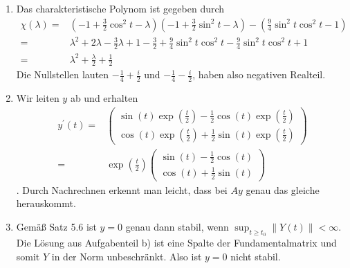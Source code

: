 \begin{solution}
\begin{enumerate}[label = \textbf{\alph*)}]
  \item Das charakteristische Polynom ist gegeben durch
  \begin{align*}
    \chi (\lambda) =& (-1 + \frac{3}{2}\cos^2 t - \lambda)(-1 + \frac{3}{2}\sin^2 t - \lambda) - (\frac{9}{4}\sin^2 t \cos^2 t - 1) \\
    =& \lambda^2 +2\lambda - \frac{3}{2} \lambda + 1 - \frac{3}{2} + \frac{9}{4}\sin^2 t \cos^2 t - \frac{9}{4} \sin^{2} t \cos^2 t + 1 \\
    =& \lambda^2 + \frac{\lambda}{2} + \frac{1}{2}
  \end{align*}
  Die Nullstellen lauten $- \frac{1}{4}+\frac{i}{2}$ und $- \frac{1}{4}-\frac{i}{2}$, haben also negativen Realteil.
  \item Wir leiten $y$ ab und erhalten
  \begin{align*}
    y^{\prime}(t) =& \begin{pmatrix}
      \sin(t)\exp(\frac{t}{2}) -\frac{1}{2}\cos(t)\exp(\frac{t}{2}) \\ \cos(t)\exp(\frac{t}{2}) + \frac{1}{2}\sin(t)\exp(\frac{t}{2})
    \end{pmatrix} \\
    =& \exp(\frac{t}{2}) \begin{pmatrix}
      \sin(t) -\frac{1}{2}\cos(t) \\ \cos(t) + \frac{1}{2}\sin(t)
    \end{pmatrix}
  \end{align*}.
  Durch Nachrechnen erkennt man leicht, dass bei $Ay$ genau das gleiche herauskommt.
  \item Gemäß Satz 5.6 ist $y = 0$ genau dann stabil, wenn ${\sup}_{t \geq t_0} \| Y(t)\| < \infty$. Die Lösung aus Aufgabenteil b) ist eine Spalte der Fundamentalmatrix und somit $Y$ in der Norm unbeschränkt. Also ist $y= 0$ nicht stabil.
  \end{enumerate}
\end{solution}
